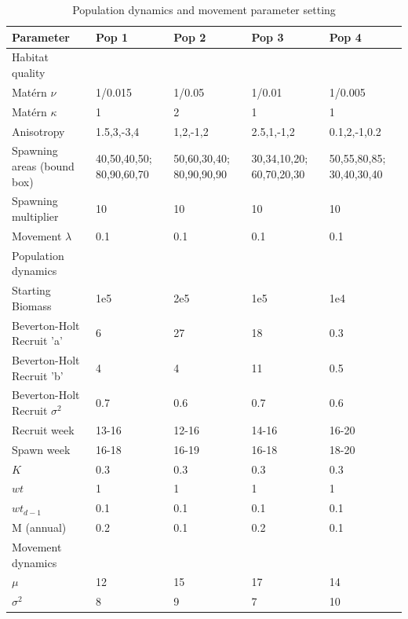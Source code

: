 \documentclass[review]{elsarticle}
\begin{document}
\begin{table}[!ht]
\caption{Population dynamics and movement parameter setting}
	\begin{tabular}{ p{4cm } p{2cm} p{2cm} p{2cm} p{2cm}}
	Parameter & Pop 1 & Pop 2 & Pop 3 & Pop 4 \\
	\hline
	Habitat quality & & & \\
	\hline
	Matérn $\nu$ & 1/0.015 & 1/0.05 & 1/0.01 & 1/0.005  \\
	Matérn $\kappa$ & 1 & 2 & 1 & 1  \\
	Anisotropy & 1.5,3,-3,4 & 1,2,-1,2 & 2.5,1,-1,2 & 0.1,2,-1,0.2 \\
	Spawning areas (bound box) & 40,50,40,50; 80,90,60,70 &
	50,60,30,40; 80,90,90,90 & 30,34,10,20; 60,70,20,30 & 50,55,80,85; 30,40,30,40 \\
	Spawning multiplier & 10 & 10 & 10 & 10 \\
	Movement $\lambda$ & 0.1 & 0.1 & 0.1 & 0.1 \\
	\hline
	Population dynamics & & & & \\
	\hline
	Starting Biomass & 1e5 & 2e5 & 1e5 & 1e4 \\
	Beverton-Holt Recruit 'a' & 6 & 27 & 18 & 0.3  \\
	Beverton-Holt Recruit 'b' & 4 & 4 & 11 & 0.5 \\
	Beverton-Holt Recruit $\sigma^2$ & 0.7 & 0.6 & 0.7 & 0.6 \\
	Recruit week & 13-16 & 12-16 & 14-16 & 16-20 \\
	Spawn week & 16-18 & 16-19 & 16-18 & 18-20 \\
	$K$ & 0.3 & 0.3 & 0.3 & 0.3 \\
	$wt$ & 1 & 1 & 1 & 1 \\
	$wt_{d-1}$ & 0.1 & 0.1 & 0.1 & 0.1 \\
	M (annual) & 0.2 & 0.1 & 0.2 & 0.1 \\
	\hline
	Movement dynamics & & & & \\
	\hline
	$\mu$ & 12 & 15 & 17 & 14 \\
	$\sigma^2$ & 8 & 9 & 7 & 10 \\
	\hline
\end{tabular}
\label{tab:1}
\end{table}
\end{document}
